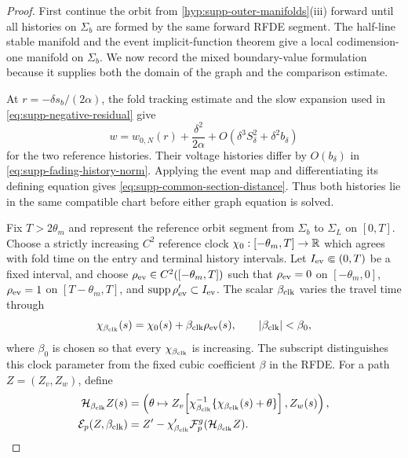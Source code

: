 \begin{proof}
First continue the orbit from
\cref{hyp:supp-outer-manifolds}(iii) forward until all histories on
\(\Sigma_b\) are formed by the same forward RFDE segment.  The half-line
stable manifold and the event implicit-function theorem give a local
codimension-one manifold on \(\Sigma_b\).  We now record the mixed
boundary-value formulation because it supplies both the domain of the
graph and the comparison estimate.

At \(r=-\delta s_b/(2\alpha)\), the fold tracking estimate and the slow
expansion used in \cref{eq:supp-negative-residual} give
\[
 w=w_{0,N}(r)+\frac{\delta^2}{2\alpha}
     +O(\delta^3S_\delta^2+\delta^2b_\delta)
\]
for the two reference histories.  Their voltage histories differ by
\(O(b_\delta)\) in \cref{eq:supp-fading-history-norm}.  Applying the event
map and differentiating its defining equation gives
\cref{eq:supp-common-section-distance}.  Thus both histories lie in the
same compatible chart before either graph equation is solved.

Fix \(T>2\theta_m\) and represent the reference orbit segment from
\(\Sigma_b\) to \(\Sigma_L\) on \([0,T]\).  Choose a strictly increasing
\(C^2\) reference clock
\(\chi_0:[-\theta_m,T]\to\mathbb R\) which agrees with fold time on the entry and
terminal history intervals.  Let \(I_{\rm ev}\Subset(0,T)\) be a fixed
interval, and choose \(\rho_{\rm ev}\in C^2([ -\theta_m,T])\) such that
\(\rho_{\rm ev}=0\) on \([ -\theta_m,0]\),
\(\rho_{\rm ev}=1\) on \([T-\theta_m,T]\), and
\(\operatorname{supp}\rho_{\rm ev}'\subset I_{\rm ev}\).  The scalar
\(\beta_{\rm clk}\) varies the
travel time through
\begin{equation}
 \chi_{\beta_{\rm clk}}(s)
 =\chi_0(s)+\beta_{\rm clk}\rho_{\rm ev}(s),
 \qquad \left\lvert\beta_{\rm clk}\right\rvert<\beta_0,
 \label{eq:supp-clock-family}
\end{equation}
where \(\beta_0\) is chosen so that every \(\chi_{\beta_{\rm clk}}\) is
increasing.  The subscript distinguishes this clock parameter from the fixed
cubic coefficient \(\beta\) in the RFDE.
For a path \(Z=(Z_v,Z_w)\), define
\begin{align}
 \mathcal H_{\beta_{\rm clk}} Z(s)
 &=\left(\theta\mapsto
 Z_v\!\left[\chi_{\beta_{\rm clk}}^{-1}
       \{\chi_{\beta_{\rm clk}}(s)+\theta\}\right],Z_w(s)\right),\notag\\
 \mathcal E_p(Z,\beta_{\rm clk})
 &=Z'-\chi_{\beta_{\rm clk}}'\mathcal F_p^g
       (\mathcal H_{\beta_{\rm clk}} Z).
 \label{eq:supp-clocked-history-residual}
\end{align}


\end{proof}
